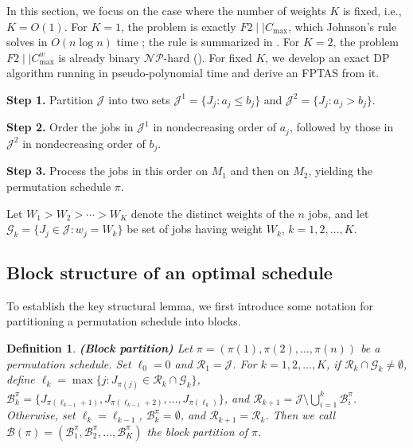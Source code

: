 \documentclass[12pt]{article} \textheight=24.5cm \textwidth=16.5cm \parskip = 0.165cm
\newtheorem{definition}{Definition}[section]
\begin{document}
\begin{sloppypar}
        In this section, we focus on the case where the number of weights $K$ is fixed, i.e., $K=O(1)$.
        For $K=1$, the problem is exactly $F2 \mid \mid C_{\max}$, which Johnson's rule solves in $O(n \log n)$ time \citep{Johnson1954NRL}; the rule is summarized in .
        For $K=2$, the problem $F2 \mid \mid C_{\max}^w$ is already binary $\mathcal{NP}$-hard ().
        For fixed $K$, we develop an exact DP algorithm running in pseudo-polynomial time and derive an FPTAS from it.
        
        \begin{algorithm}[H]
            \small
            \SetAlgoLined
            \DontPrintSemicolon
            \caption{Johnson's rule for $F2\mid\mid C_{\max}$}\label{alg:Johnson}
            \BlankLine
            \textbf{Step 1.} Partition $\mathcal{J}$ into two sets $\mathcal{J}^1=\{J_j: a_j \leq b_j\}$
            and $\mathcal{J}^2=\{J_j: a_j>b_j\}$.
            
            \textbf{Step 2.} Order the jobs in $\mathcal{J}^1$ in nondecreasing order of $a_j$, followed by those in $\mathcal{J}^2$ in nondecreasing order of $b_j$. \;
            
            \textbf{Step 3.} Process the jobs in this order on $M_1$ and then on $M_2$, yielding the permutation schedule $\pi$. \;
            
        \end{algorithm}
        
        Let $W_1 > W_2 > \cdots > W_K$ denote the distinct weights of the $n$ jobs, and let $\mathcal{G}_k = \{J_j \in \mathcal{J}: w_j = W_k\}$ be set of jobs having weight $W_k$, $k=1, 2,\ldots, K$.
        
        \subsection{Block structure of an optimal schedule} \label{sec:block}
        
        To establish the key structural lemma, we first introduce some notation for partitioning a permutation schedule into blocks.
        \begin{definition} \label{def:block}
            \textbf{(Block partition)} Let $\pi = (\pi(1), \pi(2), \ldots, \pi(n))$ be a permutation schedule.
            Set $\ell_0 = 0$ and $\mathcal{R}_1=\mathcal{J}$.
            For $k = 1, 2, \ldots, K$, if $\mathcal{R}_k \cap \mathcal{G}_k \neq \emptyset$, define $\ell_k=\max \{j: J_{\pi(j)} \in \mathcal{R}_k \cap \mathcal{G}_k\}$, $\mathcal{B}_k^{\pi} = \{J_{\pi(\ell_{k-1}+1)}, J_{\pi(\ell_{k-1}+2)}, \ldots, J_{\pi(\ell_k)}\}$, and $\mathcal{R}_{k+1}=\mathcal{J}\setminus\bigcup_{i=1}^{k}\mathcal{B}_i^{\pi}$.
            Otherwise, set $\ell_k=\ell_{k-1}$,  $\mathcal{B}_k^{\pi} =\emptyset$, and $\mathcal{R}_{k+1}=\mathcal{R}_{k}$.
            Then we call $\mathcal{B}(\pi)=(\mathcal{B}_1^{\pi}, \mathcal{B}_2^{\pi}, \ldots, \mathcal{B}_K^{\pi})$ the block partition of $\pi$.
        \end{definition}
        

\end{sloppypar}
\end{document}
